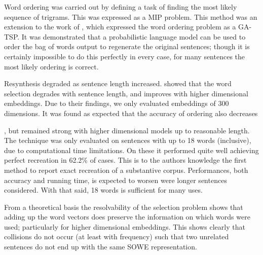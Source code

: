 \documentclass[11pt]{article}
\theoremstyle{plain}
\theoremstyle{definition}
\begin{document}
Word ordering was carried out by defining a task of finding the most likely sequence of trigrams. This was expressed as a MIP problem. This method was an extension to the work of \textcite{Horvat2014}, which expressed the word ordering problem as a GA-TSP. It was demonstrated that a probabilistic language model can be used to order the bag of words output to regenerate the original sentences; though it is certainly impossible to do this perfectly in every case, for many sentences the most likely ordering is correct.

Resynthesis degraded as sentence length increased. \textcite{White2015BOWgen} showed that the word selection degrades with sentence length, and improves with higher dimensional embeddings. Due to their findings, we only evaluated embeddings of 300 dimensions. It was found as expected that the accuracy of ordering also decreases

, but remained strong with higher dimensional models up to reasonable length. The technique was only evaluated on sentences with up to 18 words (inclusive), due to computational time limitations. On these it performed quite well achieving perfect recreation in 62.2\% of cases. This is to the authors knowledge the first method to report exact recreation of a substantive corpus. Performances, both accuracy and running time, is expected to worsen were longer sentences considered. With that said, 18 words is sufficient for many uses.

From a theoretical basis the resolvability of the selection problem shows that adding up the word vectors does preserve the information on which words were used; particularly for higher dimensional embeddings. This shows clearly that collisions do not occur (at least with frequency) such that two unrelated sentences do not end up with the same SOWE representation. 


\printbibliography
	
\end{document}
